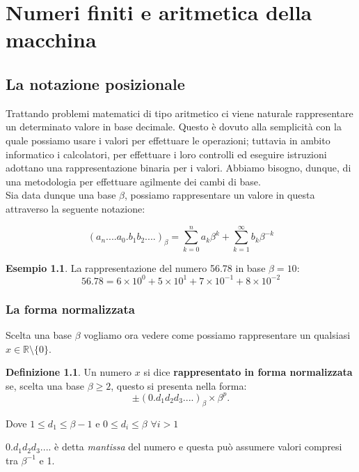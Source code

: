 \documentclass[12pt, a4paper]{book}
\theoremstyle{definition}
\newtheorem{exmp}{Esempio}[section]
\newtheorem{defn}{Definizione}[section]
\begin{document}
\chapter{Numeri finiti e aritmetica della macchina}

\section{La notazione posizionale}
\begin{flushleft}
Trattando problemi matematici di tipo aritmetico ci viene naturale rappresentare un determinato valore in base decimale. Questo è dovuto alla semplicità con la quale possiamo usare i valori per effettuare le operazioni; tuttavia in ambito informatico i calcolatori, per effettuare i loro controlli ed eseguire istruzioni adottano una rappresentazione binaria per i valori. Abbiamo bisogno, dunque, di una metodologia per effettuare agilmente dei cambi di base.\\

Sia data dunque una base $\beta$, possiamo rappresentare un valore in questa attraverso la seguente notazione:

\[ 
	(a_{n}....a_{0}.b_{1}b_{2}....)_{\beta} = \sum_{k=0}^{n}a_{k}\beta^{k} + \sum_{k=1}^{\infty}b_{k}\beta^{-k} 
\]

\begin{exmp}
La rappresentazione del numero 56.78 in base $\beta = 10$:
\[ 
	56.78 = 6 \times 10^{0} + 5 \times 10^{1} + 7 \times 10^{-1} + 8 \times 10^{-2}
\]
\end{exmp}
\end{flushleft}


\subsection{La forma normalizzata}
\begin{flushleft}
Scelta una base $\beta$ vogliamo ora vedere come possiamo rappresentare un qualsiasi $x \in \mathbb{R}  \setminus \{ 0 \}$.

\begin{defn}
Un numero $x$ si dice \textbf{rappresentato in forma normalizzata} se,  scelta una base $\beta \geq 2$,  questo si presenta nella forma: 
\[ 
	\pm (0.d_{1}d_{2}d_{3}....)_{\beta} \times \beta^{p}. 
\]

Dove $ 1 \leq d_{1} \leq \beta - 1 $ e $ 0 \leq d_{i} \leq \beta $ $\forall i > 1$
\end{defn}
$0.d_{1}d_{2}d_{3}....$ è detta \textit{mantissa} del numero e questa può assumere valori compresi tra $\beta^{-1}$ e 1.
\end{flushleft}
\end{document}

